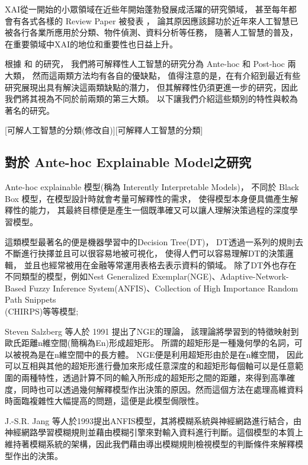 \documentclass[class=NCU_thesis, crop=false]{standalone}
\begin{document}
XAI從一開始的小眾領域在近些年開始蓬勃發展成活躍的研究領域，
甚至每年都會有各式各樣的 Review Paper 被發表\cite{A2023100230} \cite{10188681}，
論其原因應該歸功於近年來人工智慧已被各行各業所應用於分類、物件偵測、資料分析等任務，
隨著人工智慧的普及，在重要領域中XAI的地位和重要性也日益上升。

根據 \cite{Nielsen_2022} 和 \cite{LONGO2024102301} 的研究，
我們將可解釋性人工智慧的研究分為 Ante-hoc 和 Post-hoc 兩大類，
然而這兩類方法均有各自的優缺點，
值得注意的是，在\cite{LONGO2024102301}有介紹到最近有些研究展現出具有解決這兩類缺點的潛力，
但其解釋性仍須更進一步的研究，因此我們將其視為不同於前兩類的第三大類。
以下讓我們介紹這些類別的特性與較為著名的研究。

[可解人工智慧的分類(修改自\cite{YangCNNInterpretable})][可解釋人工智慧的分類]

\subsection{對於 Ante-hoc Explainable Model之研究}
Ante-hoc explainable 模型(\cite{Nielsen_2022}稱為 Interently Interpretable Models)，
不同於 Black Box 模型，在模型設計時就會考量可解釋性的需求，
使得模型本身便具備產生解釋性的能力，
其最終目標便是產生一個既準確又可以讓人理解決策過程的深度學習模型。

這類模型最著名的便是機器學習中的Decision Tree(DT)\cite{rokach2016decision}，
DT透過一系列的規則去不斷進行抉擇並且可以很容易地被可視化，
使得人們可以容易理解DT的決策邏輯，
並且也經常被用在金融等常運用表格去表示資料的領域\cite{grinsztajn2022tree}。
除了DT外也存在不同類型的模型，例如Nest Generalized Exemplar(NGE)\cite{salzberg1991nearest}、Adaptive-Network-Based Fuzzy Inference System(ANFIS)\cite{256541}、Collection of High Importance Random Path Snippets\\(CHIRPS)\cite{hatwell2020chirps}等等模型;

Steven Salzberg 等人於 1991 提出了NGE\cite{salzberg1991nearest}的理論，
該理論將學習到的特徵映射到歐氏距離n維空間(簡稱為En)形成超矩形。
所謂的超矩形是一種幾何學的名詞，可以被視為是在n維空間中的長方體。
NGE便是利用超矩形由於是在n維空間，
因此可以互相與其他的超矩形進行疊加來形成任意深度的和超矩形每個軸可以是任意範圍的兩種特性，透過計算不同的輸入所形成的超矩形之間的距離，來得到高準確度，同時也可以透過幾何解釋模型作出決策的原因。然而這個方法在處理高維資料時面臨複雜性大幅提高的問題，這便是此模型侷限性。

J.-S.R. Jang 等人於1993提出ANFIS模型\cite{256541}，其將模糊系統與神經網路進行結合，由神經網路學習模糊規則並藉由模糊引擎來對輸入資料進行判斷。這個模型的本質上維持著模糊系統的架構，因此我們藉由導出模糊規則檢視模型的判斷條件來解釋模型作出的決策。
\end{document}

